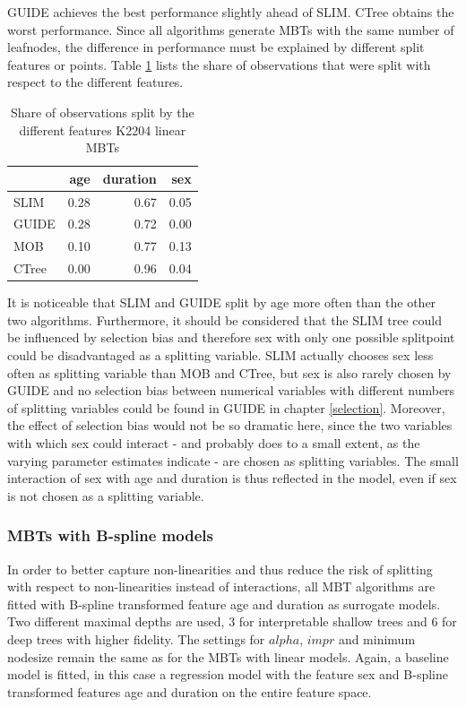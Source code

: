 GUIDE achieves the best performance slightly ahead of SLIM. CTree obtains the worst performance.
Since all algorithms generate MBTs with the same number of leafnodes, the difference in performance must be explained by different split features or points.
Table \ref{tab:ins_k2204_lm_surrogates_share} lists the share of observations that were split with respect to the different features.

\begin{table}[!htb]

\caption{Share of observations split by the different features K2204 linear MBTs}
\centering \scriptsize
\begin{tabular}[t]{l|r|r|r}
\hline
& age & duration & sex\\
\hline
SLIM & 0.28 & 0.67 & 0.05\\
GUIDE & 0.28 & 0.72 & 0.00\\
MOB & 0.10 & 0.77 & 0.13\\
CTree & 0.00 & 0.96 & 0.04\\
\hline
\end{tabular}
\label{tab:ins_k2204_lm_surrogates_share}
\end{table}


It is noticeable that SLIM and GUIDE split by age more often than the other two algorithms.
Furthermore, it should be considered that the SLIM tree could be influenced by selection bias and therefore sex with only one possible splitpoint could be disadvantaged as a splitting variable. SLIM actually chooses sex less often as splitting variable than MOB and CTree, but sex is also rarely chosen by GUIDE and no selection bias between numerical variables with different numbers of splitting variables could be found in GUIDE in chapter \ref{selection}. 
Moreover, the effect of selection bias would not be so dramatic here, since the two variables with which sex could interact - and probably does to a small extent, as the varying parameter estimates indicate - are chosen as splitting variables. The small interaction of sex with age and duration is thus reflected in the model, even if sex is not chosen as a splitting variable.

\subsubsection{MBTs with B-spline models}

In order to better capture non-linearities and thus reduce the risk of splitting with respect to non-linearities instead of interactions, all MBT algorithms are fitted with B-spline transformed feature age and duration as surrogate models. 
Two different maximal depths are used, 3 for interpretable shallow trees and 6 for deep trees with higher fidelity. The settings for $alpha$, $impr$ and minimum nodesize remain the same as for the MBTs with linear models.  Again, a baseline model is fitted, in this case a regression model with the feature sex and B-spline transformed features age and duration on the entire feature space. 

